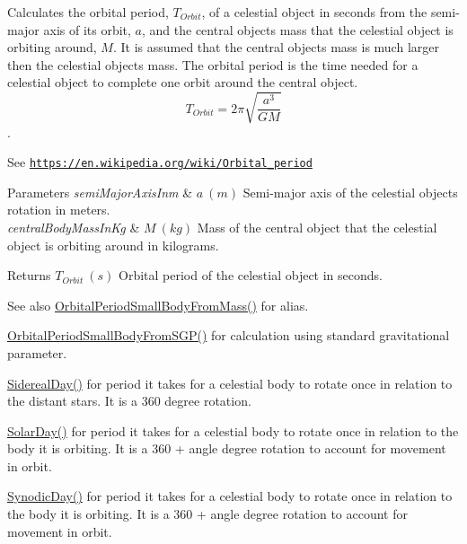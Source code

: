 Calculates the orbital period, $T_{Orbit}$, of a celestial object in seconds from the semi-\/major axis of its orbit, $a$, and the central object\textquotesingle{}s mass that the celestial object is orbiting around, $M$. It is assumed that the central object\textquotesingle{}s mass is much larger then the celestial objects mass. The orbital period is the time needed for a celestial object to complete one orbit around the central object. \[ T_{Orbit}=2\pi\sqrt{\dfrac{a^3}{GM}}\]. 

See \href{https://en.wikipedia.org/wiki/Orbital_period}{\tt https\+://en.\+wikipedia.\+org/wiki/\+Orbital\+\_\+period}


\begin{DoxyParams}{Parameters}
{\em semi\+Major\+Axis\+Inm} & $ a\ (m)$ Semi-\/major axis of the celestial object\textquotesingle{}s rotation in meters. \\
\hline
{\em central\+Body\+Mass\+In\+Kg} & $ M\ (kg)$ Mass of the central object that the celestial object is orbiting around in kilograms. \\
\hline
\end{DoxyParams}
\begin{DoxyReturn}{Returns}
$ T_{Orbit}\ (s)$ Orbital period of the celestial object in seconds. 
\end{DoxyReturn}
\begin{DoxySeeAlso}{See also}
\mbox{\hyperlink{group___e_g_x_phys-_astrophysic-_orbital_period_gadfd6fdd5cb1861d8204c3c5cd32a65b5}{Orbital\+Period\+Small\+Body\+From\+Mass()}} for alias. 

\mbox{\hyperlink{group___e_g_x_phys-_astrophysic-_orbital_period_gab3773d2109aef45ef4649b56e36d13f3}{Orbital\+Period\+Small\+Body\+From\+S\+G\+P()}} for calculation using standard gravitational parameter. 

\mbox{\hyperlink{group___e_g_x_phys-_astrophysic-_sidereal_day_ga587900d5fc755228c1bb5121cd7965c6}{Sidereal\+Day()}} for period it takes for a celestial body to rotate once in relation to the distant stars. It is a 360 degree rotation. 

\mbox{\hyperlink{group___e_g_x_phys-_astrophysic-_solar_day_gae321e0dd0c031a57c45b15dc819635e0}{Solar\+Day()}} for period it takes for a celestial body to rotate once in relation to the body it is orbiting. It is a 360 + angle degree rotation to account for movement in orbit. 

\mbox{\hyperlink{group___e_g_x_phys-_astrophysic-_synodic_day_ga637140842bc008c87d90e65b551cbac7}{Synodic\+Day()}} for period it takes for a celestial body to rotate once in relation to the body it is orbiting. It is a 360 + angle degree rotation to account for movement in orbit. 
\end{DoxySeeAlso}
\mbox{\label{group___e_g_x_phys-_astrophysic-_orbital_period_gadfd6fdd5cb1861d8204c3c5cd32a65b5}} 
